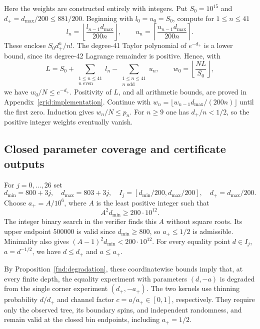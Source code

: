 Here the weights are constructed entirely with integers.  Put
$S_0=10^{15}$ and $d_+=d_{\max}/200\leq881/200$.  Beginning with
$l_0=u_0=S_0$, compute for $1\leq n\leq41$
\[
 l_n=\left\lfloor\frac{l_{n-1}d_{\max}}{200n}\right\rfloor,
 \qquad
 u_n=\left\lceil\frac{u_{n-1}d_{\max}}{200n}\right\rceil.
\]
These enclose $S_0d_+^n/n!$.  The degree-41 Taylor polynomial of
$e^{-d_+}$ is a lower bound, since its degree-42 Lagrange remainder is
positive.  Hence, with
\begin{equation}
 L=S_0+\sum_{\substack{1\leq n\leq41\\n\text{ even}}}l_n
             -\sum_{\substack{1\leq n\leq41\\n\text{ odd}}}u_n,
 \qquad
 w_0=\left\lfloor\frac{NL}{S_0}\right\rfloor,
 \label{grid:taylor}
\end{equation}
we have $w_0/N\leq e^{-d_+}$.  Positivity of $L$, and all arithmetic
bounds, are proved in Appendix~\ref{grid:implementation}.
Continue with
$w_n=\lfloor w_{n-1}d_{\max}/(200n)\rfloor$ until the first zero.
Induction gives $w_n/N\leq p_n$.  For $n\geq9$ one has
$d_+/n<1/2$, so the positive integer weights eventually vanish.

\subsection{Closed parameter coverage and certificate outputs}

For $j=0,\ldots,26$ set
\begin{equation}
 d_{\min}=800+3j,\quad d_{\max}=803+3j,\quad
 I_j=[d_{\min}/200,d_{\max}/200],\quad d_+=d_{\max}/200.
 \label{grid:bins}
\end{equation}
Choose $a_+=A/10^6$, where $A$ is the least positive integer such that
\begin{equation}
 A^2d_{\min}\geq200\cdot10^{12}.
 \label{grid:magnitude}
\end{equation}
The integer binary search in the verifier finds this $A$ without square
roots.  Its upper endpoint $500000$ is valid since $d_{\min}\geq800$,
so $a_+\leq1/2$ is admissible.  Minimality also gives
$(A-1)^2d_{\min}<200\cdot10^{12}$.
For every equality point $d\in I_j$, $a=d^{-1/2}$, we have
$d\leq d_+$ and $a\leq a_+$.

By Proposition~\ref{fnd:degradation}, these coordinatewise bounds imply
that, at every finite depth, the equality experiment with parameters
$(d,-a)$ is degraded from the single corner experiment $(d_+,-a_+)$.
The two kernels use thinning probability $d/d_+$ and channel factor
$c=a/a_+\in[0,1]$, respectively. They require only the observed tree,
its boundary spins, and independent randomness, and remain valid at
the closed bin endpoints, including $a_+=1/2$.

